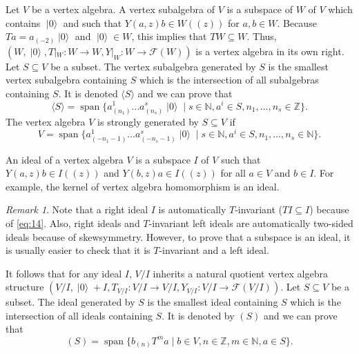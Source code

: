 \documentclass[a4paper, 12pt, reqno]{amsart}
\theoremstyle{remark}
\newtheorem{remark}[theorem]{Remark}
\numberwithin{equation}{subsection}
\DeclareMathOperator{\vspan}{span}
\DeclareMathOperator{\vac}{|0\rangle}
\begin{document}
Let $V$ be a vertex algebra.
A vertex subalgebra of $V$ is a subspace of $W$ of $V$ which contains $\vac$ and such that $Y(a, z)b \in W((z))$ for $a, b\in W$.
Because $Ta = a_{(-2)}\vac$ and $\vac\in W$, this implies that $TW \subseteq W$.
Thus, $(W, \vac, T|_{W}: W \to W, Y|_{W}: W \to \mathcal{F}(W))$ is a vertex algebra in its own right.
Let $S \subseteq V$ be a subset.
The vertex subalgebra generated by $S$ is the smallest vertex subalgebra containing $S$ which is the intersection of all subalgebras containing $S$.
It is denoted $\langle S \rangle$ and we can prove that
\begin{equation*}
  \langle S \rangle = \vspan \{a^1_{(n_1)}\dots a^s_{(n_s)}\vac \mid s \in \mathbb{N}, a^i \in S, n_1, \dots, n_s \in \mathbb{Z}\}.
\end{equation*}
The vertex algebra $V$ is strongly generated by $S \subseteq V$ if
\begin{equation*}
  V = \vspan \{a^1_{(-n_1 - 1)}\dots a^s_{(-n_s - 1)}\vac \mid s \in \mathbb{N}, a^i \in S, n_1, \dots, n_s \in \mathbb{N}\}.
\end{equation*}

An ideal of a vertex algebra $V$ is a subspace $I$ of $V$ such that $Y(a, z)b \in I((z))$ and $Y(b, z)a \in I((z))$ for all $a \in V$ and $b \in I$.
For example, the kernel of vertex algebra homomorphism is an ideal.

\begin{remark}
  \label{rmk:11}
  Note that a right ideal $I$ is automatically $T$-invariant ($TI \subseteq I$) because of \eqref{eq:14}.
  Also, right ideals and $T$-invariant left ideals are automatically two-sided ideals because of skewsymmetry.
  However, to prove that a subspace is an ideal, it is usually easier to check that it is $T$-invariant and a left ideal.
\end{remark}

It follows that for any ideal $I$, $V/I$ inherits a natural quotient vertex algebra structure $(V/I, \vac + I,T_{V/I}: V/I \to V/I, Y_{V/I}: V/I \to \mathcal{F}(V/I))$.
Let $S \subseteq V$ be a subset.
The ideal generated by $S$ is the smallest ideal containing $S$ which is the intersection of all ideals containing $S$.
It is denoted by $(S)$ and we can prove that
\begin{equation*}
  (S) = \vspan\{b_{(n)}T^ma \mid b \in V, n \in \mathbb{Z}, m \in \mathbb{N}, a \in S\}.
\end{equation*}
\end{document}
